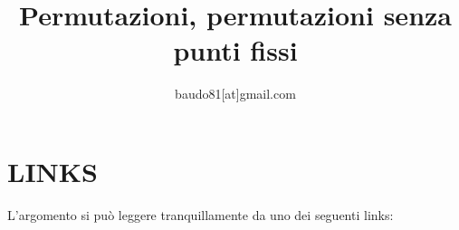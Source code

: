 \documentclass[a4paper,10pt]{article}
\title{Permutazioni, permutazioni senza punti fissi}
\author{baudo81[at]gmail.com}
\begin{document}
\maketitle

\section{LINKS}
L'argomento si può leggere tranquillamente da uno dei seguenti links:



\end{document}

